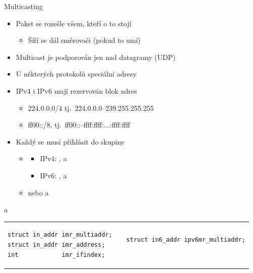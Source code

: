 \begin{frame}[fragile]{Multicasting}

  \begin{itemize}
    \item Paket se rozešle všem, kteří o to stojí
    \begin{itemize}
      \item Šíří se dál směrovači (pokud to umí)
    \end{itemize}

    \pause

    \item Multicast je podporován jen nad datagramy (UDP)

    \pause

    \item U některých protokolů speciální adresy

    \pause

    \item IPv4 i IPv6 mají rezervován blok adres
    \begin{itemize}
      \item 224.0.0.0/4 tj.\ 224.0.0.0--239.255.255.255
      \item ff00::/8, tj.\ ff00::--ffff:ffff:...:ffff:ffff
    \end{itemize}

    \pause

    \item Každý se musí přihlásit do skupiny
    \begin{itemize}
      \item {}
      \begin{itemize}
	\item IPv4: ,  a 
	\item IPv6: ,  a
      \end{itemize}

      \pause

      \item {} nebo  a 
    \end{itemize}
  \end{itemize}


  \begin{block}{ a }
  \begin{tabular}{lp{2em}l}
  \begin{lstlisting}[aboveskip=2pt,belowskip=2pt]
struct in_addr imr_multiaddr;
struct in_addr imr_address;
int            imr_ifindex;
  \end{lstlisting} & &
  \begin{lstlisting}[aboveskip=2pt,belowskip=2pt,showlines]
struct in6_addr ipv6mr_multiaddr;


\end{lstlisting}
\end{tabular}
\end{block}
\end{frame}
